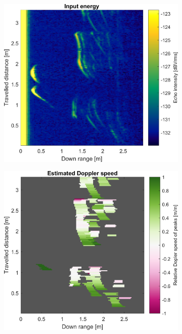 \begin{figure}[htbp]
    \centering
    \begin{subfigure}[t]{0.475\linewidth}
        \centering
        \includegraphics[width=\linewidth,max height=.475\textheight]{gfx/results/virtualreality_input.png}
    \end{subfigure}%
    \hfill%
    \begin{subfigure}[t]{0.475\linewidth}
        \centering
        \includegraphics[width=\linewidth,max height=.475\textheight]{gfx/results/virtualreality_doppler.png}

\end{subfigure}
\end{figure}
